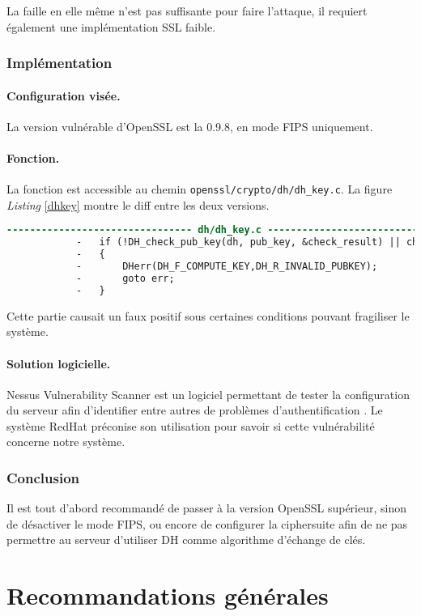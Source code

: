 		La faille en elle même n'est pas suffisante pour faire l'attaque, il requiert également une implémentation SSL faible. 
	
		\subsubsection{Implémentation}
		
			\paragraph{Configuration visée.\\}
		
			La version vulnérable d'OpenSSL est la 0.9.8, en mode FIPS uniquement.

			\paragraph{Fonction.\\}

			La fonction est accessible au chemin \texttt{openssl/crypto/dh/dh\_key.c}. La figure \textit{Listing} \ref{dhkey} montre le diff entre les deux versions.

			\begin{lstlisting}[language=diff,caption=dh\_key.c, label=dhkey]
			-------------------------------- dh/dh_key.c --------------------------------
			-	if (!DH_check_pub_key(dh, pub_key, &check_result) || check_result)
			-	{
			-		DHerr(DH_F_COMPUTE_KEY,DH_R_INVALID_PUBKEY);
			-		goto err;
			-	}
			\end{lstlisting}

			Cette partie causait un faux positif sous certaines conditions pouvant fragiliser le système.

			\paragraph{Solution logicielle.\\}

			Nessus Vulnerability Scanner est un logiciel permettant de tester la configuration du serveur afin d'identifier entre autres de problèmes d'authentification \cite{nessus}. Le système RedHat préconise son utilisation pour savoir si cette vulnérabilité concerne notre système.
		
	\subsubsection{Conclusion}

		Il est tout d'abord recommandé de passer à la version OpenSSL supérieur, sinon de désactiver le mode FIPS, ou encore de configurer la ciphersuite afin de ne pas permettre au serveur d'utiliser DH comme algorithme d'échange de clés.



\section{Recommandations générales}

